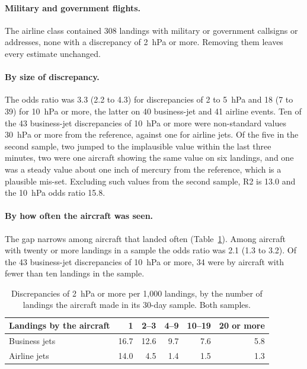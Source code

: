 \documentclass[11pt]{article}
\begin{document}
\paragraph{Military and government flights.} The airline class contained 308 landings with military or government callsigns or addresses, none with a discrepancy of 2~hPa or more. Removing them leaves every estimate unchanged.

\paragraph{By size of discrepancy.} The odds ratio was 3.3 (2.2 to 4.3) for discrepancies of 2 to 5~hPa and 18 (7 to 39) for 10~hPa or more, the latter on 40 business-jet and 41 airline events. Ten of the 43 business-jet discrepancies of 10~hPa or more were non-standard values 30~hPa or more from the reference, against one for airline jets. Of the five in the second sample, two jumped to the implausible value within the last three minutes, two were one aircraft showing the same value on six landings, and one was a steady value about one inch of mercury from the reference, which is a plausible mis-set. Excluding such values from the second sample, R2 is 13.0 and the 10~hPa odds ratio 15.8.

\paragraph{By how often the aircraft was seen.} The gap narrows among aircraft that landed often (Table~\ref{tab:util}). Among aircraft with twenty or more landings in a sample the odds ratio was 2.1 (1.3 to 3.2). Of the 43 business-jet discrepancies of 10~hPa or more, 34 were by aircraft with fewer than ten landings in the sample.

\begin{table}[h]
\centering
\caption{Discrepancies of 2~hPa or more per 1{,}000 landings, by the number of landings the aircraft made in its 30-day sample. Both samples.}\label{tab:util}
\begin{tabular}{lrrrrr}
\toprule
Landings by the aircraft & 1 & 2--3 & 4--9 & 10--19 & 20 or more \\
\midrule
Business jets & 16.7 & 12.6 & 9.7 & 7.6 & 5.8 \\
Airline jets & 14.0 & 4.5 & 1.4 & 1.5 & 1.3 \\
\bottomrule
\end{tabular}
\end{table}
\end{document}
